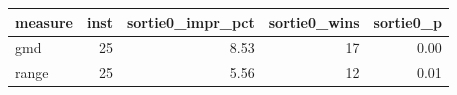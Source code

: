 \begin{tabular}{lrrrr}
\toprule
measure & inst & sortie0_impr_pct & sortie0_wins & sortie0_p \\
\midrule
gmd & 25 & 8.53 & 17 & 0.00 \\
range & 25 & 5.56 & 12 & 0.01 \\
\bottomrule
\end{tabular}
